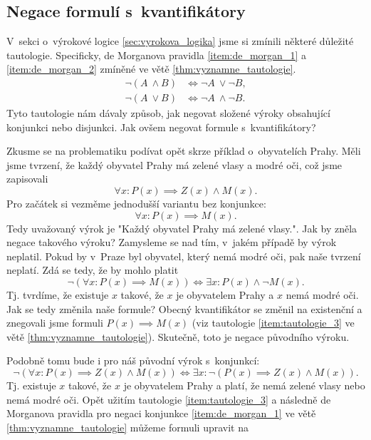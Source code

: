 \subsection{Negace formulí s~kvantifikátory}
V~sekci o~výrokové logice \ref{sec:vyrokova_logika} jsme si zmínili některé důležité tautologie. Specificky, de Morganova pravidla \ref{item:de_morgan_1} a \ref{item:de_morgan_2} zmíněné ve větě \ref{thm:vyznamne_tautologie}.
\begin{align*}
    \neg (A~\land B) &\iff \neg A~\lor \neg B,\\
    \neg (A~\lor B) &\iff \neg A~\land \neg B.
\end{align*}
Tyto tautologie nám dávaly způsob, jak negovat složené výroky obsahující konjunkci nebo disjunkci. Jak ovšem negovat formule s~kvantifikátory?\par
Zkusme se na problematiku podívat opět skrze příklad o~obyvatelích Prahy. Měli jsme tvrzení, že každý obyvatel Prahy má zelené vlasy a modré oči, což jsme zapisovali
\begin{equation*}
    \forall x : P(x)\implies Z(x) \land M(x).
\end{equation*}
Pro začátek si vezměme jednodušší variantu bez konjunkce:
\begin{equation*}
    \forall x : P(x)\implies M(x).
\end{equation*}
Tedy uvažovaný výrok je "Každý obyvatel Prahy má zelené vlasy.". Jak by zněla negace takového výroku? Zamysleme se nad tím, v~jakém případě by výrok neplatil. Pokud by v~Praze byl obyvatel, který nemá modré oči, pak naše tvrzení neplatí. Zdá se tedy, že by mohlo platit
\begin{equation*}
    \neg(\forall x : P(x)\implies M(x)) \iff \exists x: P(x) \land \neg M(x).
\end{equation*}
Tj. tvrdíme, že existuje $x$ takové, že $x$ je obyvatelem Prahy a $x$ nemá modré oči. Jak se tedy změnila naše formule? Obecný kvantifikátor se změnil na existenční a znegovali jsme formuli $P(x)\implies M(x)$ (viz tautologie \ref{item:tautologie_3} ve větě \ref{thm:vyznamne_tautologie}). Skutečně, toto je negace původního výroku.\par
Podobně tomu bude i pro náš původní výrok s~konjunkcí:
\begin{equation*}
    \neg(\forall x : P(x)\implies Z(x) \land M(x)) \iff \exists x : \neg (P(x)\implies Z(x) \land M(x)).
\end{equation*}
Tj. existuje $x$ takové, že $x$ je obyvatelem Prahy a platí, že nemá zelené vlasy nebo nemá modré oči. Opět užitím tautologie \ref{item:tautologie_3} a následně de Morganova pravidla pro negaci konjunkce \ref{item:de_morgan_1} ve větě \ref{thm:vyznamne_tautologie} můžeme formuli upravit na
